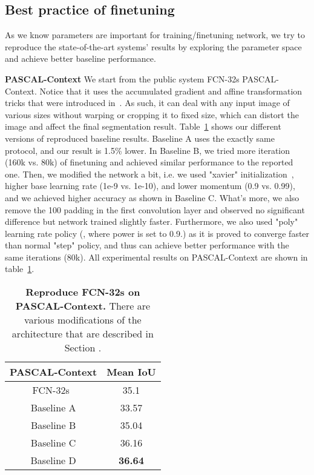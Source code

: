 \documentclass{article} \usepackage{iclr2016_conference}
\begin{document}
\subsection{Best practice of finetuning}
As we know parameters are important for training/finetuning network, we try to reproduce the state-of-the-art systems' results by exploring the parameter space and achieve better baseline performance.

\noindent\textbf{PASCAL-Context} We start from the public system FCN-32s PASCAL-Context. Notice that it uses the accumulated gradient and affine transformation tricks that were introduced in~\cite{long2014fully}. As such, it can deal with any input image of various sizes without warping or cropping it to fixed size, which can distort the image and affect the final segmentation result. Table~\ref{tab:pascalcontextbase} shows our different versions of reproduced baseline results. Baseline A uses the exactly same protocol, and our result is 1.5\% lower. In Baseline B, we tried more iteration (160k vs. 80k) of finetuning and achieved similar performance to the reported one. Then, we modified the network a bit, i.e. we used "xavier" initialization~\cite{glorot2010understanding}, higher base learning rate (1e-9 vs. 1e-10), and lower momentum (0.9 vs. 0.99), and we achieved  higher accuracy as shown in Baseline C. What's more, we also remove the 100 padding in the first convolution layer and observed no significant difference but network trained slightly faster. Furthermore, we also used "poly" learning rate policy (, where power is set to 0.9.) as it is proved to converge faster than normal "step" policy, and thus can achieve  better performance with the same iterations (80k). All experimental results on PASCAL-Context are shown in table~\ref{tab:pascalcontextbase}.

\begin{table}[!htb]
	\centering
	\begin{tabular}{c|c}
		PASCAL-Context & Mean IoU\\
		\hline\hline
		FCN-32s~\tablefootnote{\url{https://gist.github.com/shelhamer/80667189b218ad570e82\#file-readme-md}} & 35.1\\
		\hline
		Baseline A & 33.57\\
		Baseline B & 35.04\\
		Baseline C & 36.16\\
		Baseline D & \textbf{36.64}\\
		\hline
	\end{tabular}
	\caption{\textbf{Reproduce FCN-32s on PASCAL-Context.} There are various modifications of the architecture that are described in Section .}\label{tab:pascalcontextbase}
\end{table}
\end{document}
